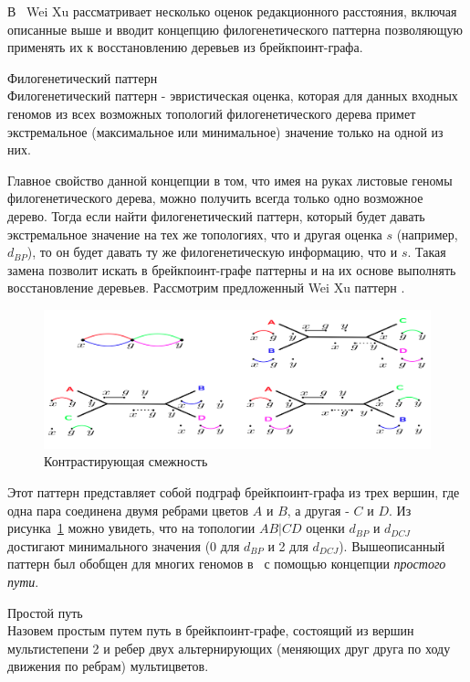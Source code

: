 В~\cite{xu2010exploring} Wei Xu рассматривает несколько оценок редакционного расстояния, включая описанные выше
и вводит концепцию филогенетического паттерна позволяющую применять их к восстановлению деревьев из брейкпоинт-графа.
\begin{define}{Филогенетический паттерн} \\
  Филогенетический паттерн - эвристическая оценка, которая для данных входных геномов
  из всех возможных топологий филогенетического дерева примет экстремальное (максимальное или минимальное) значение только на одной из них.
\end{define}
Главное свойство данной концепции в том, что имея на руках листовые геномы филогенетического дерева, можно получить всегда только одно возможное дерево.
Тогда если найти филогенетический паттерн, который будет давать экстремальное значение на тех же топологиях, что и другая оценка $s$ (например, $d_{BP}$), то он будет давать ту же филогенетическую информацию, что и $s$.
Такая замена позволит искать в брейкпоинт-графе паттерны и на их основе выполнять восстановление деревьев.
Рассмотрим предложенный Wei Xu паттерн .
\begin{figure}[H]
  \includegraphics[max width=\linewidth]{fig/2/contrasting_adjacency.png}
  \caption{Контрастирующая смежность~\cite{xu2010exploring}}
  \label{fig:contrasting_adjacency}
\end{figure}
Этот паттерн представляет собой подграф брейкпоинт-графа из трех вершин, где одна пара соединена двумя ребрами цветов $A$ и $B$, а другая - $C$ и $D$.
Из рисунка~\ref{fig:contrasting_adjacency} можно увидеть, что на топологии $AB|CD$ оценки $d_{BP}$ и $d_{DCJ}$ достигают минимального значения (0 для $d_{BP}$ и 2 для $d_{DCJ}$).
Вышеописанный паттерн был обобщен для многих геномов в~\cite{Alekseyev2009} с помощью концепции \textit{простого пути}.
\begin{define}{Простой путь} \\
  Назовем простым путем путь в брейкпоинт-графе, состоящий из вершин мультистепени 2 и ребер двух альтернирующих
  (меняющих друг друга по ходу движения по ребрам) мультицветов.
\end{define}

